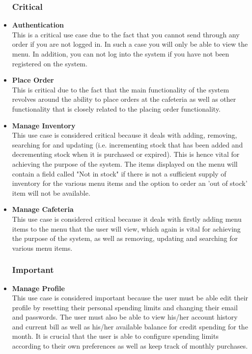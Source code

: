 \documentclass[a4paper,12pt]{report}
\begin{document}
\begin{itemize}

\subsubsection{Critical}
\item \textbf{Authentication} \\
This is a critical use case due to the fact that you cannot send through any order if you are not logged in. In such a case you will only be able to view the menu. In addition, you can not log into the system if you have not been registered on the system.

\item \textbf{Place Order}\\
This is critical due to the fact that the main functionality of the system revolves around the ability to place orders at the cafeteria as well as other functionality that is closely related to the placing order functionality.

\item \textbf{Manage Inventory} \\
This use case is considered critical because it deals with adding, removing, searching for and updating (i.e. incrementing stock that has been added and decrementing stock when it is purchased or expired). This is hence vital for achieving the purpose of the system. The items displayed on the menu will contain a field called "Not in stock" if there is not a sufficient supply of inventory for the various menu items and the option to order an 'out of stock' item will not be available. 

\item \textbf{Manage Cafeteria} \\
This use case is considered critical because it deals with firstly adding menu items to the menu that the user will view, which again is vital for achieving the purpose of the system, as well as removing, updating and searching for various menu items. 

\subsubsection{Important}
\item \textbf{Manage Profile} \\
This use case is considered important because the user must be able edit their profile by resetting their personal spending limits and changing their email and passwords. The user must also be able to view his/her account history and current bill as well as his/her available balance for credit spending for the month. It is crucial that the user is able to configure spending limits according to their own preferences as well as keep track of monthly purchases.


\end{itemize}
\end{document}
